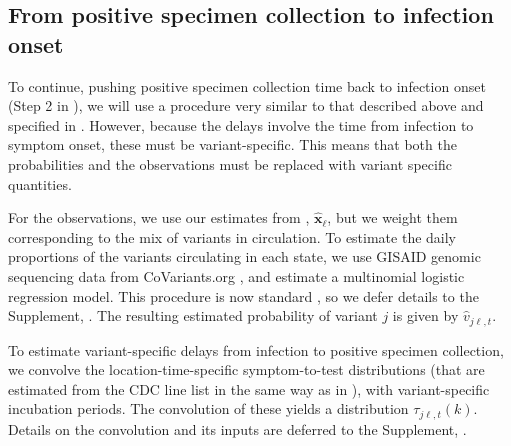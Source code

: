 \subsection{From positive specimen collection to infection onset}
\label{sec:step2-and-3}

To continue, pushing positive specimen collection time back to infection onset
(Step 2 in ), we will use a procedure very
similar to that described above and specified in
. However, because
the delays involve the time from infection to symptom onset, these must be
variant-specific. This means that both the probabilities and the observations
must be replaced with variant specific quantities. 

For the observations, we use our estimates from ,
$\widehat{\mathbf{x}}_\ell$, but we weight them corresponding to the mix of
variants in circulation. To estimate the daily proportions of the variants
circulating in each state, we use GISAID genomic sequencing data from
CoVariants.org \citep{hodcroft2021covariants, elbe2017data}, and estimate a
multinomial logistic regression model. This procedure is now standard
\citep{obermeyer2022analysis, annavajhala2021emergence, figgins2021sars}, so we
defer details to the Supplement, . The resulting
estimated probability of variant $j$ is given by $\hat{v}_{j\ell,t}$.

To estimate variant-specific delays from infection to positive specimen
collection, we convolve the location-time-specific symptom-to-test distributions
(that are estimated from the CDC line list in the same way as in ), 
with variant-specific incubation periods.
The convolution of these yields a distribution $\tau_{j\ell,t}(k)$. 
Details on the convolution and its inputs are deferred to the Supplement, 
. 

